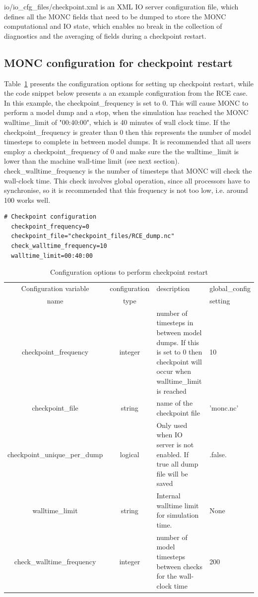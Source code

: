 \documentclass[a4paper,11pt]{article}
\begin{document}
io/io\_cfg\_files/checkpoint.xml is an XML IO server configuration file,
which defines all the MONC fields that need to be
dumped to store the MONC computational and IO
state, which enables no break in the collection of diagnostics and the averaging
of fields during a checkpoint restart.

\subsection{MONC configuration for checkpoint restart}

Table~\ref{tab:monc_checkpoint_config} presents the configuration options
for setting up checkpoint restart, while the code snippet below presents a
an example configuration from the RCE case. In this example,
the checkpoint\_frequency is set to 0. This will cause
MONC to perform a model dump and a stop, when the simulation has reached the
MONC walltime\_limit of "00:40:00", which is 40 minutes of wall clock time.
If the checkpoint\_frequency is greater than 0 then this represents
the number of model timesteps to complete in between model dumps. It is recommended
that all users employ a checkpoint\_frequency of 0 and make sure the the walltime\_limit
is lower than the machine wall-time limit (see next section). check\_walltime\_frequency
is the number of timesteps that MONC will check the wall-clock time. This check involves
global operation, since all processors have to synchronise, so it is recommended
that this frequency is not too low, i.e. around 100 works well.

\begin{lstlisting}[caption={Snippet of the MONC configuration for
  checkpoint restarting. Taken from
  testcases/radiative\_convective\_equilibrium/RCE\_MO\_cray.mcf}]
  # Checkpoint configuration
  checkpoint_frequency=0
  checkpoint_file="checkpoint_files/RCE_dump.nc"
  check_walltime_frequency=10
  walltime_limit=00:40:00
\end{lstlisting}

\begin{table}[H]
  \protect\caption{Configuration options to perform checkpoint restart}
\label{tab:monc_checkpoint_config}
\begin{tabular}{|c|c|p{5cm}|p{3cm}|}
\hline
Configuration variable & configuration & description & global\_config \tabularnewline
name & type & & setting \tabularnewline
\hline
   checkpoint\_frequency & integer & number of timesteps in between model dumps. If this is set to 0 then checkpoint will occur when walltime\_limit is reached & 10 \tabularnewline
\hline
   checkpoint\_file & string & name of the checkpoint file & 'monc.nc' \tabularnewline
\hline
  checkpoint\_unique\_per\_dump & logical & Only used when IO server is not enabled. If true all dump file will be saved  & .false. \tabularnewline
\hline
  walltime\_limit & string & Internal walltime limit for simulation time. & None \tabularnewline
\hline
   check\_walltime\_frequency & integer & number of model timesteps between checks for the wall-clock time & 200 \tabularnewline
\hline
\hline
\end{tabular}
\end{table}
\end{document}
